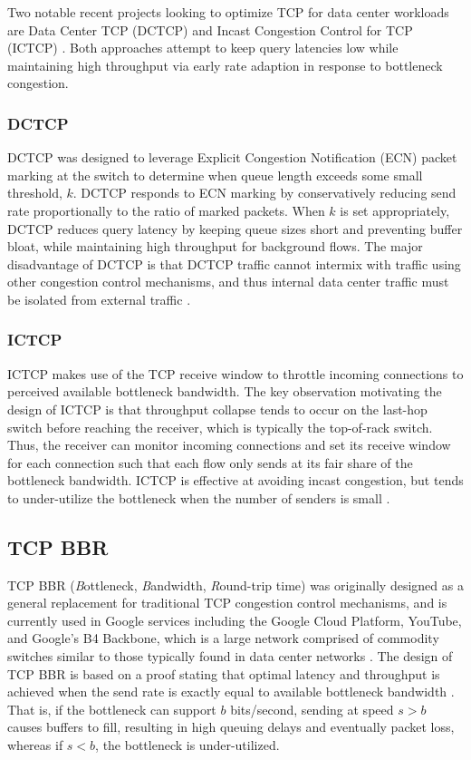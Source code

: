 \documentclass[letterpaper,twocolumn,10pt]{article}
\begin{document}
Two notable recent projects looking to optimize TCP for data center workloads are Data Center TCP (DCTCP) and Incast Congestion Control for TCP (ICTCP) \cite{alizadeh_data_2010, wu_ictcp:_2013}. Both approaches attempt to keep query latencies low while maintaining high throughput via early rate adaption in response to bottleneck congestion.

\subsubsection{DCTCP}

DCTCP was designed to leverage Explicit Congestion Notification (ECN) packet marking at the switch to determine when queue length exceeds some small threshold, $k$. DCTCP responds to ECN marking by conservatively reducing send rate proportionally to the ratio of marked packets. When $k$ is set appropriately, DCTCP reduces query latency by keeping queue sizes short and preventing buffer bloat, while maintaining high throughput for background flows. The major disadvantage of DCTCP is that DCTCP traffic cannot intermix with traffic using other congestion control mechanisms, and thus internal data center traffic must be isolated from external traffic \cite{alizadeh_data_2010, alizadeh_analysis_2011}.

\subsubsection{ICTCP}

ICTCP makes use of the TCP receive window to throttle incoming connections to perceived available bottleneck bandwidth. The key observation motivating the design of ICTCP is that throughput collapse tends to occur on the last-hop switch before reaching the receiver, which is typically the top-of-rack switch. Thus, the receiver can monitor incoming connections and set its receive window for each connection such that each flow only sends at its fair share of the bottleneck bandwidth. ICTCP is effective at avoiding incast congestion, but tends to under-utilize the bottleneck when the number of senders is small \cite{wu_ictcp:_2013}.

\subsection{TCP BBR}

TCP BBR (\emph{B}ottleneck, \emph{B}andwidth, \emph{R}ound-trip time) was originally designed as a general replacement for traditional TCP congestion control mechanisms, and is currently used in Google services including the Google Cloud Platform, YouTube, and Google's B4 Backbone, which is a large network comprised of commodity switches similar to those typically found in data center networks \cite{cardwell_bbr:_2016, cardwell_tcp_2017}. The design of TCP BBR is based on a proof stating that optimal latency and throughput is achieved when the send rate is exactly equal to available bottleneck bandwidth \cite{kleinrock_power_1979}. That is, if the bottleneck can support $b$ bits/second, sending at speed $s > b$ causes buffers to fill, resulting in high queuing delays and eventually packet loss, whereas if $s < b$, the bottleneck is under-utilized. 
\end{document}
